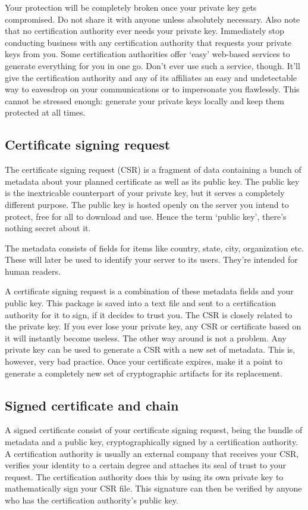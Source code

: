 \documentclass[a4paper,12pt]{article}
\begin{document}
Your protection will be completely broken once your private key gets compromised. Do not share it with anyone unless absolutely necessary. Also note that no certification authority ever needs your private key. Immediately stop conducting business with any certification authority that requests your private keys from you. Some certification authorities offer `easy' web-based services to generate everything for you in one go. Don't ever use such a service, though. It'll give the certification authority and any of its affiliates an easy and undetectable way to eavesdrop on your communications or to impersonate you flawlessly. This cannot be stressed enough: generate your private keys locally and keep them protected at all times.

\subsection{Certificate signing request}
The certificate signing request (CSR) is a fragment of data containing a bunch of metadata about your planned certificate as well as its public key. The public key is the inextricable counterpart of your private key, but it serves a completely different purpose. The public key is hosted openly on the server you intend to protect, free for all to download and use. Hence the term `public key', there's nothing secret about it.

The metadata consists of fields for items like country, state, city, organization etc. These will later be used to identify your server to its users. They're intended for human readers.

A certificate signing request is a combination of these metadata fields and your public key. This package is saved into a text file and sent to a certification authority for it to sign, if it decides to trust you. The CSR is closely related to the private key. If you ever lose your private key, any CSR or certificate based on it will instantly become useless. The other way around is not a problem. Any private key can be used to generate a CSR with a new set of metadata. This is, however, very bad practice. Once your certificate expires, make it a point to generate a completely new set of cryptographic artifacts for its replacement.

\subsection{Signed certificate and chain}
A signed certificate consist of your certificate signing request, being the bundle of metadata and a public key, cryptographically signed by a certification authority. A certification authority is usually an external company that receives your CSR, verifies your identity to a certain degree and attaches its seal of trust to your request. The certification authority does this by using its own private key to mathematically sign your CSR file. This signature can then be verified by anyone who has the certification authority's public key.
\end{document}
